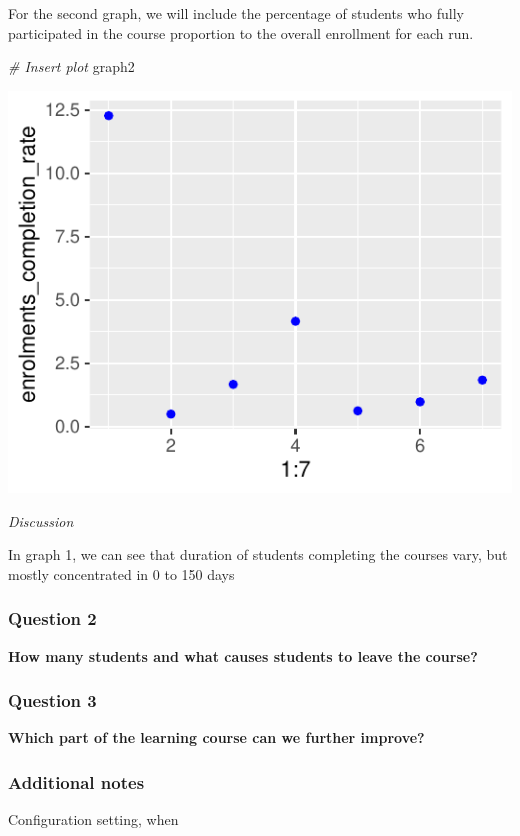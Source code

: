 \documentclass[12pt,]{article}
\newenvironment{Shaded}{\begin{snugshade}}{\end{snugshade}}
\newcommand{\CommentTok}[1]{\textcolor[rgb]{0.56,0.35,0.01}{\textit{#1}}}
\newcommand{\NormalTok}[1]{#1}
\begin{document}
For the second graph, we will include the percentage of students who
fully participated in the course proportion to the overall enrollment
for each run.

\begin{Shaded}
\begin{Highlighting}[]
\CommentTok{\# Insert plot}
\NormalTok{graph2}
\end{Highlighting}
\end{Shaded}

\begin{center}\includegraphics{report_files/figure-latex/unnamed-chunk-8-1} \end{center}

\emph{Discussion}

In graph 1, we can see that duration of students completing the courses
vary, but mostly concentrated in 0 to 150 days

\hypertarget{question-2}{%
\subsubsection{Question 2}\label{question-2}}

\textbf{How many students and what causes students to leave the course?}

\hypertarget{question-3}{%
\subsubsection{Question 3}\label{question-3}}

\textbf{Which part of the learning course can we further improve?}

\hypertarget{additional-notes}{%
\subsubsection{Additional notes}\label{additional-notes}}

Configuration setting, when





\newpage
\singlespacing 

\end{document}
